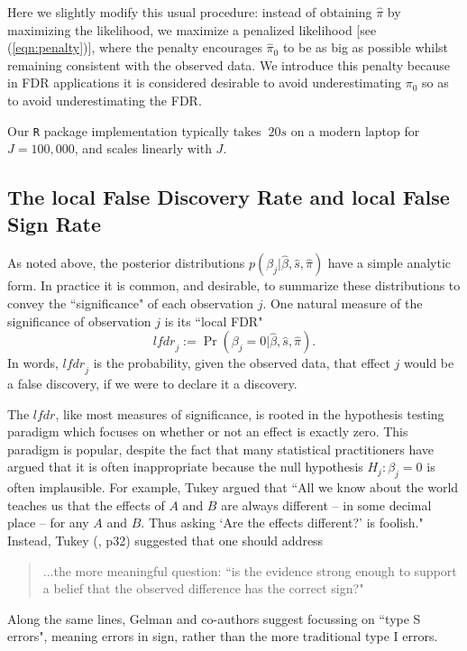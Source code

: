 \documentclass[11pt]{article}
\def\lfdr{\textit{lfdr}}
\def\bhat{\hat{\beta}}
\def\shat{\hat{s}}
\begin{document}
Here we slightly modify this usual procedure: instead of obtaining $\hat\pi$ by maximizing the likelihood, we maximize a penalized
likelihood [see (\ref{eqn:penalty})], where the penalty encourages $\hat\pi_0$ to be as big as possible whilst remaining consistent with the observed data. 
We introduce this penalty because in FDR applications it is considered desirable to avoid underestimating $\pi_0$ so as to avoid underestimating the FDR. 

Our {\tt R} package implementation typically takes $~20s$ on a modern laptop for $J=100,000$, and scales linearly with $J$. 


\subsection*{The local False Discovery Rate and local False Sign Rate}

As noted above, the posterior distributions $p(\beta_j | \bhat, \shat, \hat{\pi})$ have a simple analytic form.
In practice it is common, and desirable, to summarize these distributions to convey the ``significance" of each observation $j$.
One natural measure of the significance of observation $j$ is its ``local FDR" \cite{efron2008microarrays}
\begin{equation} \label{eqn:fdr}
\lfdr_j := \Pr(\beta_j =0  |  \bhat, \shat, \hat{\pi}).
\end{equation}
In words, $\lfdr_j$ is the probability, given the observed data, that effect $j$ would be a false discovery, if we were to declare it a discovery.

The $\lfdr$, like most measures of significance, is rooted in the hypothesis testing paradigm which focuses on 
whether or not an effect is exactly zero. This paradigm is popular, despite the fact that many statistical practitioners have argued that it is often inappropriate because
the null hypothesis $H_j: \beta_j=0$ is often implausible. For example, Tukey \cite{tukey1991philosophy} argued that
``All we know about the world teaches us that the effects of $A$ and $B$ are always different -- in some decimal place -- for any $A$ and $B$. Thus asking `Are the effects different?' is foolish." Instead, Tukey (\cite{tukey1962future}, p32) suggested  that one should address
\begin{quote}
...the more meaningful question: ``is the evidence strong enough to support a belief that the observed difference has the correct sign?"
\end{quote}
Along the same lines, Gelman and co-authors \cite{gelman2000type, gelman2012we} suggest  
focussing on ``type S errors", meaning errors in sign, rather than the more traditional type I errors.
\end{document}
